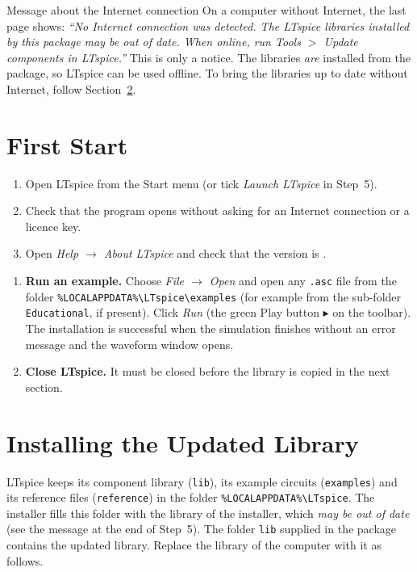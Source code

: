 \begin{notebox}{Message about the Internet connection}
On a computer without Internet, the last page shows:
\textit{``No Internet connection was detected. The LTspice libraries installed by this package may be
out of date. When online, run Tools $>$ Update components in LTspice.''}
This is only a notice. The libraries \emph{are} installed from the package, so LTspice can be used offline.
To bring the libraries up to date without Internet, follow Section~\ref{sec:lib}.
\end{notebox}

\section{First Start}\label{sec:first}
\begin{enumerate}[itemsep=2pt]
  \item Open LTspice from the Start menu (or tick \textit{Launch LTspice} in Step~5).
  \item Check that the program opens without asking for an Internet connection or a licence key.
  \item Open \textit{Help $\rightarrow$ About LTspice} and check that the version is \ltspiceVersion.
\end{enumerate}
\begin{enumerate}[itemsep=2pt,resume]
  \item \textbf{Run an example.} Choose \textit{File $\rightarrow$ Open} and open any \texttt{.asc} file from the folder
        \texttt{\%LOCALAPPDATA\%\textbackslash LTspice\textbackslash examples} (for example from the sub-folder \texttt{Educational}, if present).
        Click \textit{Run} (the green Play button $\blacktriangleright$ on the toolbar). The installation is successful when the simulation finishes without an error message and the
        waveform window opens.
  \item \textbf{Close LTspice.} It must be closed before the library is copied in the next section.
\end{enumerate}

\section{Installing the Updated Library}\label{sec:lib}
LTspice keeps its component library (\texttt{lib}), its example circuits (\texttt{examples}) and its
reference files (\texttt{reference}) in the folder \texttt{\%LOCALAPPDATA\%\textbackslash LTspice}.
The installer fills this folder with the library of the installer, which \emph{may be out of date}
(see the message at the end of Step~5). The folder \texttt{lib} supplied in the package contains the
updated library. Replace the library of the computer with it as follows.

